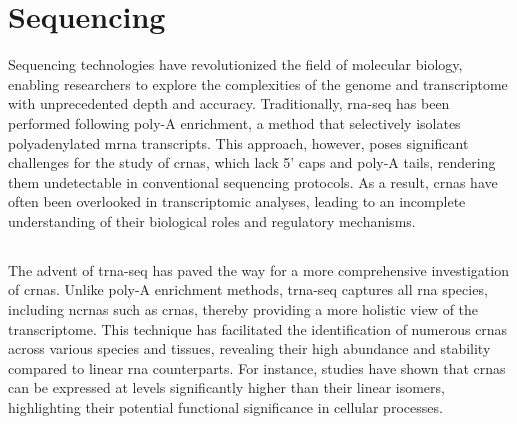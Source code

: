 \section{Sequencing }

Sequencing technologies have revolutionized the field of molecular biology,
enabling researchers to explore the complexities of the genome and
transcriptome with unprecedented depth and accuracy.
Traditionally, \gls{rna-seq} has been performed following poly-A enrichment, a
method that selectively isolates polyadenylated \gls{mrna} transcripts.
This approach, however, poses significant challenges for the study of
\glspl{crna}, which lack 5' caps and poly-A tails, rendering them undetectable
in conventional sequencing protocols\supercite{guo_expanded_2014}.
As a result, \glspl{crna} have often been overlooked in transcriptomic
analyses, leading to an incomplete understanding of their biological roles and
regulatory mechanisms.

\subsection{}
The advent of \gls{trna-seq} has paved the way for a more comprehensive
investigation of \glspl{crna}.
Unlike poly-A enrichment methods, \gls{trna-seq} captures all \gls{rna}
species, including \glspl{ncrna} such as \glspl{crna}, thereby providing a more
holistic view of the transcriptome\supercite{panda_identification_2017}.
This technique has facilitated the identification of numerous \glspl{crna}
across various species and tissues, revealing their high abundance and
stability compared to linear \gls{rna}
counterparts\supercite{liu_circular_2016,cao_expression_2018}.
For instance, studies have shown that \glspl{crna} can be expressed at levels
significantly higher than their linear isomers, highlighting their potential
functional significance in cellular processes\supercite{liu_circular_2016}.
